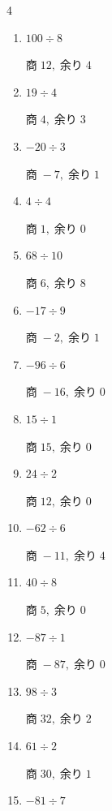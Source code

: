 \begin{multicols}{4}
\begin{enumerate}
        $商\; 3,\; 余り\; 2$

  \item $100 \div 8$

        $商\; 12,\; 余り\; 4$

  \item $19 \div 4$

        $商\; 4,\; 余り\; 3$

  \item $-20 \div 3$

        $商\; -7,\; 余り\; 1$

  \item $4 \div 4$

        $商\; 1,\; 余り\; 0$

  \item $68 \div 10$

        $商\; 6,\; 余り\; 8$

  \item $-17 \div 9$

        $商\; -2,\; 余り\; 1$

  \item $-96 \div 6$

        $商\; -16,\; 余り\; 0$

  \item $15 \div 1$

        $商\; 15,\; 余り\; 0$

  \item $24 \div 2$

        $商\; 12,\; 余り\; 0$

  \item $-62 \div 6$

        $商\; -11,\; 余り\; 4$

\columnbreak %

  \item $40 \div 8$

        $商\; 5,\; 余り\; 0$

  \item $-87 \div 1$

        $商\; -87,\; 余り\; 0$

  \item $98 \div 3$

        $商\; 32,\; 余り\; 2$

  \item $61 \div 2$

        $商\; 30,\; 余り\; 1$

  \item $-81 \div 7$


\end{enumerate}
\end{multicols}
